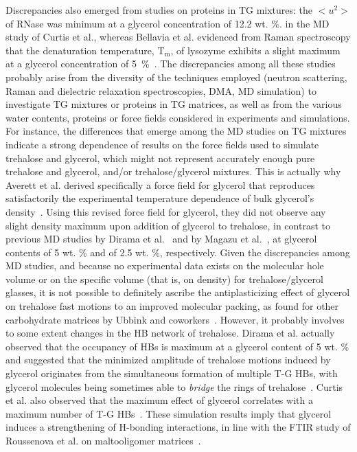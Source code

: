 \documentclass[journal=jpcbfk,manuscript=article]{achemso}
\begin{document}
\begin{singlespacing}
Discrepancies also emerged from studies on proteins in TG mixtures:
the $<u^{\textrm{2}}>$ of RNase was minimum at a glycerol concentration of 12.2 wt. \%. in the MD study of Curtis et al., 
whereas Bellavia et al. evidenced from Raman spectroscopy that 
the denaturation temperature, T${_\textrm{m}}$, of lysozyme exhibits a slight
maximum at a glycerol concentration of 5~\%~\cite{Bellavia2014}.
The discrepancies among all these studies probably arise from the diversity of the techniques employed 
(neutron scattering, Raman and dielectric relaxation spectroscopies, DMA, MD simulation) to investigate TG mixtures 
or proteins in TG matrices, as well as from the various water contents, proteins or force fields considered in experiments and simulations.
For instance, the differences that emerge among the MD
studies on TG mixtures~\cite{Dirama2005,Riggleman2008,Magazu2010,Averett2012} indicate a strong dependence of results
on the force fields used to simulate trehalose and glycerol, which might not represent accurately enough pure trehalose and glycerol, 
and/or trehalose/glycerol mixtures. 
This is actually why Averett et al. derived specifically a force field for glycerol that reproduces satisfactorily
the experimental temperature dependence of bulk glycerol's density~\cite{Averett2012}. 
Using this revised force field for glycerol, they did not observe any slight density maximum upon addition of glycerol to trehalose, 
in contrast to previous MD studies by Dirama et al.~\cite{Dirama2005} and by Magazu et al.~\cite{Magazu2010}, at glycerol
contents of 5 wt. \% and of 2.5 wt. \%, respectively. Given the discrepancies among MD studies, and because no experimental data 
exists on the molecular hole volume or on the specific volume (that is, on density) for trehalose/glycerol glasses, it is not possible 
to definitely ascribe the antiplasticizing effect of glycerol on trehalose fast motions to an improved molecular packing, 
as found for other carbohydrate matrices by Ubbink and coworkers~\cite{Ubbink2016}. However, it probably involves 
to some extent changes in the HB network of trehalose. Dirama et al. actually observed that the occupancy of HBs is maximum at a
glycerol content of 5 wt. \% and suggested that the minimized amplitude of trehalose 
motions induced by glycerol originates from the simultaneous formation of multiple T-G HBs, with glycerol molecules being sometimes 
able to \textit{bridge} the rings of trehalose~\cite{Dirama2005}. Curtis et al. also observed that the maximum effect 
of glycerol correlates with a maximum number of T-G HBs~\cite{Curtis2006}. These simulation results imply that glycerol induces
a strengthening of H-bonding interactions, in line with the FTIR study of Roussenova et al. on maltooligomer matrices~\cite{Roussenova2014}.


\end{singlespacing}
\end{document}
